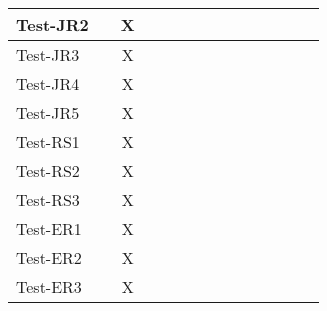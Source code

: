 \documentclass[12pt, titlepage]{article}
\begin{document}
\begin{table}[H]
\begin{adjustwidth}{-0.3in}{-0.5in}
{\begin{tabular}{c|c|c|c|c|c|c|c|c|c|c|c|c|c|}
\multicolumn{1}{|l|}{{Test-JR2}}   &             &       X      &             &             &             &             &                          &              &              &              &             &  &                    \\ \hline
\multicolumn{1}{|l|}{{Test-JR3}}   &             &       X      &             &             &             &             &                          &              &              &              &             & &                     \\ \hline
\multicolumn{1}{|l|}{{Test-JR4}}   &             &       X      &             &             &             &             &             &             &              &              &              &             &                    \\ \hline
\multicolumn{1}{|l|}{{Test-JR5}}   &             &       X      &             &             &             &             &             &             &              &              &              &             &                    \\ \hline
\multicolumn{1}{|l|}{{Test-RS1}}   &             &      X       &             &             &             &             &             &             &              &              &              &             &                      \\ \hline
\multicolumn{1}{|l|}{{Test-RS2}}   &             &      X       &             &             &             &             &             &             &              &              &              &             &                      \\ \hline
\multicolumn{1}{|l|}{{Test-RS3}}   &             &       X      &             &             &             &             &             &             &              &              &              &             &                      \\ \hline
\multicolumn{1}{|l|}{{Test-ER1}}   &             &       X      &             &             &             &             &                          &              &              &              &             &  &                    \\ \hline
\multicolumn{1}{|l|}{{Test-ER2}}   &             &       X      &             &             &             &             &                          &              &              &              &             &  &                    \\ \hline
\multicolumn{1}{|l|}{{Test-ER3}}   &             &       X      &             &             &             &             &                          &              &              &              &             &  &                    \\ \hline

\end{tabular}}
\end{adjustwidth}
\end{table}
\end{document}
